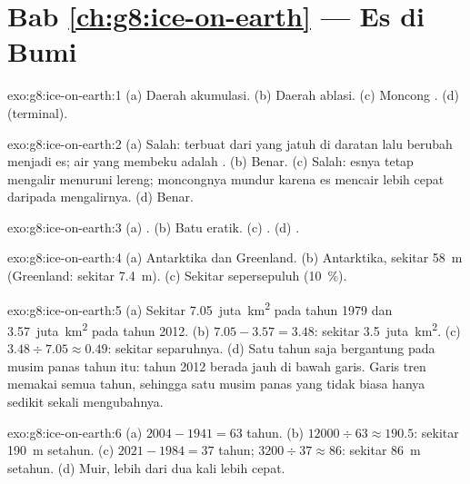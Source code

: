 \section*{Bab \ref{ch:g8:ice-on-earth} --- Es di Bumi}

\begin{solution}{exo:g8:ice-on-earth:1}
(a) Daerah akumulasi. (b) Daerah ablasi. (c) Moncong . (d) 
(terminal).
\end{solution}

\begin{solution}{exo:g8:ice-on-earth:2}
(a) Salah:  terbuat dari  yang jatuh di daratan lalu berubah
menjadi es; air  yang membeku adalah . (b) Benar. (c) Salah:
esnya tetap mengalir menuruni lereng; moncongnya mundur karena es mencair
lebih cepat daripada mengalirnya. (d) Benar.
\end{solution}

\begin{solution}{exo:g8:ice-on-earth:3}
(a) . (b) Batu eratik. (c) . (d) .
\end{solution}

\begin{solution}{exo:g8:ice-on-earth:4}
(a) Antarktika dan Greenland. (b) Antarktika, sekitar \qty{58}{m}
(Greenland: sekitar \qty{7.4}{m}). (c) Sekitar sepersepuluh (10~\%).
\end{solution}

\begin{solution}{exo:g8:ice-on-earth:5}
(a) Sekitar \num{7.05}~juta~\unit{km^2} pada tahun 1979 dan
\num{3.57}~juta~\unit{km^2} pada tahun 2012. (b) $7.05 - 3.57 = 3.48$:
sekitar \num{3.5}~juta~\unit{km^2}. (c) $3.48 \div 7.05 \approx 0.49$:
sekitar separuhnya. (d) Satu tahun saja bergantung pada  musim panas
tahun itu: tahun 2012 berada jauh di bawah garis. Garis tren memakai semua
tahun, sehingga satu musim panas yang tidak biasa hanya sedikit sekali
mengubahnya.
\end{solution}

\begin{solution}{exo:g8:ice-on-earth:6}
(a) $2004 - 1941 = 63$ tahun. (b) $12000 \div 63 \approx 190.5$: sekitar
\qty{190}{m} setahun. (c) $2021 - 1984 = 37$ tahun; $3200 \div 37 \approx
86$: sekitar \qty{86}{m} setahun. (d)  Muir, lebih dari dua kali
lebih cepat.
\end{solution}

